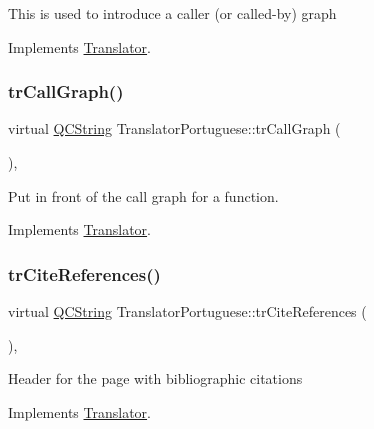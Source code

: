 This is used to introduce a caller (or called-\/by) graph 

Implements \mbox{\hyperlink{class_translator}{Translator}}.

\mbox{\label{class_translator_portuguese_a30bd52b3143a3cd2fe5baa790d9f8625}} 
\subsubsection{\texorpdfstring{trCallGraph()}{trCallGraph()}}
{\footnotesize\ttfamily virtual \mbox{\hyperlink{class_q_c_string}{Q\+C\+String}} Translator\+Portuguese\+::tr\+Call\+Graph (\begin{DoxyParamCaption}{ }\end{DoxyParamCaption})\hspace{0.3cm}{\ttfamily [inline]}, {\ttfamily [virtual]}}

Put in front of the call graph for a function. 

Implements \mbox{\hyperlink{class_translator}{Translator}}.

\mbox{\label{class_translator_portuguese_a377d557bb30de849b54ca7a195446dff}} 
\subsubsection{\texorpdfstring{trCiteReferences()}{trCiteReferences()}}
{\footnotesize\ttfamily virtual \mbox{\hyperlink{class_q_c_string}{Q\+C\+String}} Translator\+Portuguese\+::tr\+Cite\+References (\begin{DoxyParamCaption}{ }\end{DoxyParamCaption})\hspace{0.3cm}{\ttfamily [inline]}, {\ttfamily [virtual]}}

Header for the page with bibliographic citations 

Implements \mbox{\hyperlink{class_translator}{Translator}}.

\mbox{\label{class_translator_portuguese_a1ddaefcba05eca18eec416694e02309b}} 
